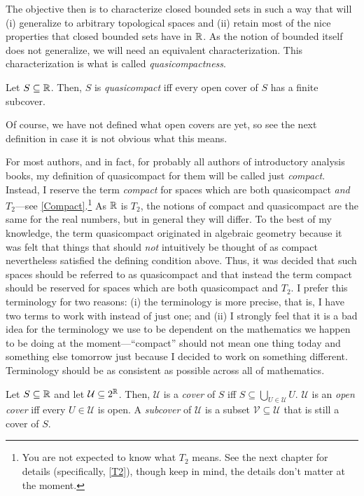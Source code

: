 The objective then is to characterize closed bounded sets in such a way that will (i) generalize to arbitrary topological spaces and (ii) retain most of the nice properties that closed bounded sets have in $\mathbb{R}$.  As the notion of bounded itself does not generalize, we will need an equivalent characterization.  This characterization is what is called \emph{quasicompactness}.
\begin{dfn}[Quasicompact]
Let $S\subseteq \mathbb{R}$.  Then, $S$ is \emph{quasicompact} iff every open cover of $S$ has a finite subcover.
\begin{rmk}
Of course, we have not defined what open covers are yet, so see the next definition in case it is not obvious what this means.
\end{rmk}
\begin{rmk}
For most authors, and in fact, for probably all authors of introductory analysis books, my definition of quasicompact for them will be called just \emph{compact}.  Instead, I reserve the term \emph{compact} for spaces which are both quasicompact \emph{and} $T_2$---see \cref{Compact}.\footnote{You are not expected to know what $T_2$ means.  See the next chapter for details (specifically, \cref{T2}), though keep in mind, the details don't matter at the moment.}  As $\mathbb{R}$ is $T_2$, the notions of compact and quasicompact are the same for the real numbers, but in general they will differ.  To the best of my knowledge, the term quasicompact originated in algebraic geometry because it was felt that things that should \emph{not} intuitively be thought of as compact nevertheless satisfied the defining condition above.  Thus, it was decided that such spaces should be referred to as quasicompact and that instead the term compact should be reserved for spaces which are both quasicompact and $T_2$.  I prefer this terminology for two reasons:  (i) the terminology is more precise, that is, I have two terms to work with instead of just one; and (ii) I strongly feel that it is a bad idea for the terminology we use to be dependent on the mathematics we happen to be doing at the moment---``compact'' should not mean one thing today and something else tomorrow just because I decided to work on something different.  Terminology should be as consistent as possible across all of mathematics.
\end{rmk}
\end{dfn}
\begin{dfn}[Cover]
Let $S\subseteq \mathbb{R}$ and let $\mathcal{U}\subseteq 2^{\mathbb{R}}$.  Then, $\mathcal{U}$ is a \emph{cover} of $S$ iff $S\subseteq \bigcup _{U\in \mathcal{U}}U$.  $\mathcal{U}$ is an \emph{open cover} iff every $U\in \mathcal{U}$ is open.  A \emph{subcover} of $\mathcal{U}$ is a subset $\mathcal{V}\subseteq \mathcal{U}$ that is still a cover of $S$.
\end{dfn}

